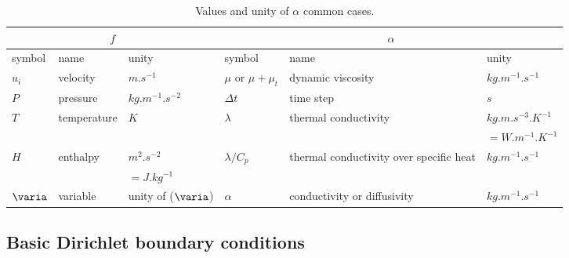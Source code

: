 \begin{table}
{\scriptsize
\begin{center}
\begin{tabular}{||l|l|l||l|l|l||}
\hline
\multicolumn{3}{||c||}{$f$}&\multicolumn{3}{|c||}{$\alpha$}\\
\hline
symbol                            & name                              & unity                    &
symbol                            & name                              & unity                  \\
\hline
$u_i$                             & velocity                          & $m.s^{-1}$                &
$\mu$ or $\mu+\mu_t$              & dynamic viscosity                 & $kg.m^{-1}.s^{-1}$     \\
$P$                               & pressure                          & $kg.m^{-1}.s^{-2}$       &
$\Delta t$                        & time step                         & $s$                      \\
$T$                               & temperature                       & $K$                        &
$\lambda$                         & thermal conductivity              & $kg.m.s^{-3}.K^{-1}$ \\
                                  &                                   &                            &
                                  &                                   & $=W.m^{-1}.K^{-1}$\\
$H$                               & enthalpy                          & $m^{2}.s^{-2}$&
$\lambda/C_p$              & thermal conductivity over specific heat  & $kg.m^{-1}.s^{-1}$     \\
                                  &                                   & $=J.kg^{-1}$&
                                  &                                   &                          \\
$\varia$                          & variable                          & unity of ($\varia$)               &
$\alpha$                          & conductivity or diffusivity       & $kg.m^{-1}.s^{-1}$     \\
\hline
\end{tabular}
\end{center}
}
\caption{Values and unity of $\alpha$ common cases.}\label{Base_Condli_table_alpha_condli}
\end{table}

\subsection{Basic Dirichlet boundary conditions}


